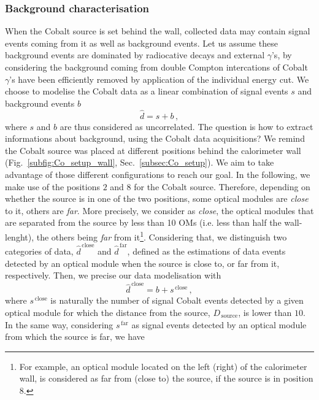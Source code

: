 \subsubsection*{Background characterisation}

When the Cobalt source is set behind the wall, collected data may contain signal events coming from it as well as background events.
Let us assume these background events are dominated by radiocative decays and external $\gamma$'s, by considering the background coming from double Compton intercations of Cobalt $\gamma$'s have been efficiently removed by application of the individual energy cut.
We choose to modelise the Cobalt data as a linear combination of signal events $s$ and background events $b$
\begin{equation}
  \hat{d}=s+b\,,
  \label{eq:estimation_data}
\end{equation}
where $s$ and $b$ are thus considered as uncorrelated.
The question is how to extract informations about background, using the Cobalt data acquisitions?
We remind the Cobalt source was placed at different positions behind the calorimeter wall (Fig.~\ref{subfig:Co_setup_wall}, Sec.~\ref{subsec:Co_setup}).
We aim to take advantage of those different configurations to reach our goal.
In the following, we make use of the positions $2$ and $8$ for the Cobalt source.
Therefore, depending on whether the source is in one of the two positions, some optical modules are \emph{close} to it, others are \emph{far}.
More precisely, we consider as \emph{close}, the optical modules that are separated from the source by less than 10 OMs (i.e. less than half the wall-lenght), the others being \emph{far} from it\footnote{For example, an optical module located on the left (right) of the calorimeter wall, is considered as far from (close to) the source, if the source is in position $8$.}.
Considering that, we distinguish two categories of data, $\hat{d}^{\,\text{close}}$ and $\hat{d}^{\,\text{far}}$, defined as the estimations of data events detected by an optical module when the source is close to, or far from it, respectively.
Then, we precise our data modelisation with
\begin{equation}
  \hat{d}^{\,\text{close}} = b + s^{\,\text{close}}\,,
  \label{eq:estimation_data_close}
\end{equation}
where $s^{\,\text{close}}$ is naturally the number of signal Cobalt events detected by a given optical module for which the distance from the source, $D_{\,\text{source}}$, is lower than $10$.
In the same way, considering $s^{\,\text{far}}$ as signal events detected by an optical module from which the source is far, we have
